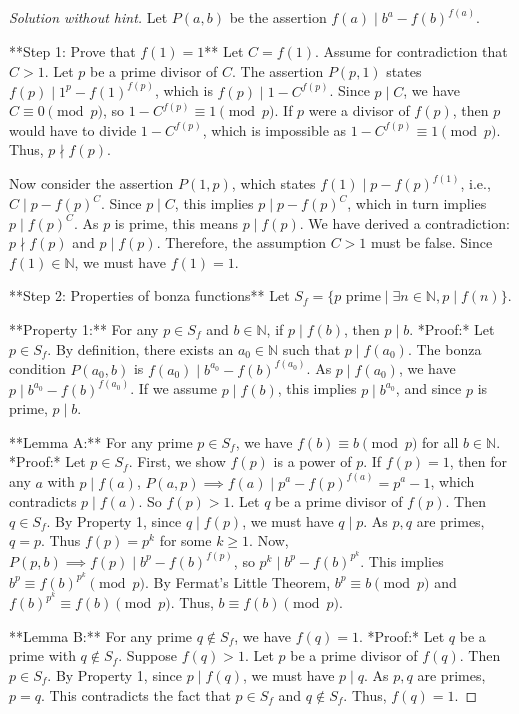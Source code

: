 \begin{proof} [Solution without hint]
Let $P(a, b)$ be the assertion $f(a) \mid b^a - f(b)^{f(a)}$.

**Step 1: Prove that $f(1)=1$**
Let $C=f(1)$. Assume for contradiction that $C>1$. Let $p$ be a prime divisor of $C$.
The assertion $P(p, 1)$ states $f(p) \mid 1^p - f(1)^{f(p)}$, which is $f(p) \mid 1 - C^{f(p)}$.
Since $p \mid C$, we have $C \equiv 0 \pmod p$, so $1 - C^{f(p)} \equiv 1 \pmod p$.
If $p$ were a divisor of $f(p)$, then $p$ would have to divide $1 - C^{f(p)}$, which is impossible as $1 - C^{f(p)} \equiv 1 \pmod p$. Thus, $p \nmid f(p)$.

Now consider the assertion $P(1, p)$, which states $f(1) \mid p - f(p)^{f(1)}$, i.e., $C \mid p - f(p)^C$.
Since $p \mid C$, this implies $p \mid p - f(p)^C$, which in turn implies $p \mid f(p)^C$.
As $p$ is prime, this means $p \mid f(p)$.
We have derived a contradiction: $p \nmid f(p)$ and $p \mid f(p)$.
Therefore, the assumption $C>1$ must be false. Since $f(1) \in \mathbb N$, we must have $f(1)=1$.

**Step 2: Properties of bonza functions**
Let $S_f = \{p \text{ prime} \mid \exists n \in \mathbb N, p \mid f(n)\}$.

**Property 1:** For any $p \in S_f$ and $b \in \mathbb{N}$, if $p \mid f(b)$, then $p \mid b$.
*Proof:* Let $p \in S_f$. By definition, there exists an $a_0 \in \mathbb{N}$ such that $p \mid f(a_0)$. The bonza condition $P(a_0, b)$ is $f(a_0) \mid b^{a_0} - f(b)^{f(a_0)}$. As $p \mid f(a_0)$, we have $p \mid b^{a_0} - f(b)^{f(a_0)}$. If we assume $p \mid f(b)$, this implies $p \mid b^{a_0}$, and since $p$ is prime, $p \mid b$.

**Lemma A:** For any prime $p \in S_f$, we have $f(b) \equiv b \pmod p$ for all $b \in \mathbb N$.
*Proof:* Let $p \in S_f$. First, we show $f(p)$ is a power of $p$. If $f(p)=1$, then for any $a$ with $p \mid f(a)$, $P(a,p) \implies f(a) \mid p^a-f(p)^{f(a)} = p^a-1$, which contradicts $p \mid f(a)$. So $f(p)>1$. Let $q$ be a prime divisor of $f(p)$. Then $q \in S_f$. By Property 1, since $q \mid f(p)$, we must have $q \mid p$. As $p,q$ are primes, $q=p$. Thus $f(p)=p^k$ for some $k \ge 1$.
Now, $P(p,b) \implies f(p) \mid b^p - f(b)^{f(p)}$, so $p^k \mid b^p - f(b)^{p^k}$. This implies $b^p \equiv f(b)^{p^k} \pmod p$. By Fermat's Little Theorem, $b^p \equiv b \pmod p$ and $f(b)^{p^k} \equiv f(b) \pmod p$. Thus, $b \equiv f(b) \pmod p$.

**Lemma B:** For any prime $q \notin S_f$, we have $f(q)=1$.
*Proof:* Let $q$ be a prime with $q \notin S_f$. Suppose $f(q)>1$. Let $p$ be a prime divisor of $f(q)$. Then $p \in S_f$. By Property 1, since $p \mid f(q)$, we must have $p \mid q$. As $p,q$ are primes, $p=q$. This contradicts the fact that $p \in S_f$ and $q \notin S_f$. Thus, $f(q)=1$.


\end{proof}
